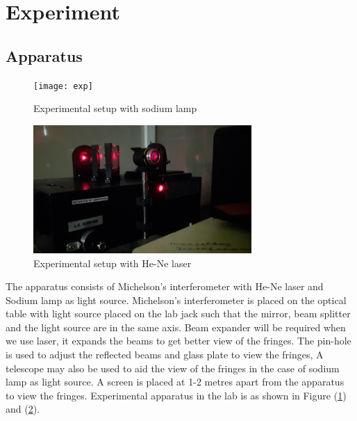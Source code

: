 \documentclass[a4paper, amsfonts, amssymb, amsmath, reprint, showkeys, nofootinbib, twoside]{revtex4-1}
\begin{document}
\section{Experiment}
\subsection{Apparatus}
\begin{figure}[htbp] %
   \centering
   \texttt{[image: exp]} 
   \caption{Experimental setup with sodium lamp}
   \label{Na}
\end{figure}

\begin{figure}[htbp] %
   \centering
   \includegraphics[width=8.3cm]{exp1} 
   \caption{Experimental setup with He-Ne laser}
   \label{la}
\end{figure}

The apparatus consists of Michelson's interferometer with He-Ne laser and Sodium lamp as light source. Michelson's interferometer is placed on the optical table with light source placed on the lab jack such that the mirror, beam splitter and the light source are in the same axis. Beam expander will be required when we use laser, it expands the beams to get better view of the fringes. The pin-hole is used to adjust the reflected beams and glass plate to view the fringes, A telescope may also be used to aid the view of the fringes in the case of sodium lamp as light source. A screen is placed at 1-2 metres apart from the apparatus to view the fringes. Experimental apparatus in the lab is as shown in Figure (\ref{Na}) and (\ref{la}).
\end{document}
